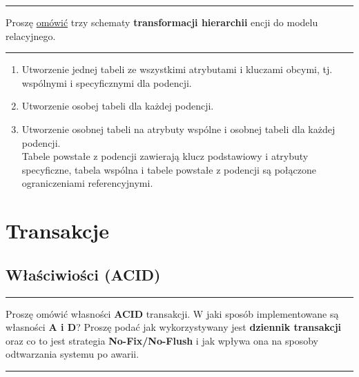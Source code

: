 \documentclass[a5paper,6pt]{article}
\newcommand{\horrule}[1]{\rule{\linewidth}{#1}}
\begin{document}
    \horrule{0.5pt}
    Proszę \underline{omówić} trzy schematy \textbf{transformacji hierarchii}
    encji do modelu relacyjnego.\\
    \horrule{0.5pt}

    \begin{enumerate}
        \item Utworzenie jednej tabeli ze wszystkimi atrybutami i kluczami
              obcymi, tj. wspólnymi i specyficznymi dla podencji.
        \item Utworzenie osobej tabeli dla każdej podencji.
        \item Utworzenie osobnej tabeli na atrybuty wspólne i osobnej tabeli
              dla każdej podencji.\\
              Tabele powstałe z podencji zawierają klucz podstawiowy i atrybuty
              specyficzne, tabela wspólna i tabele powstałe z podencji są
              połączone ograniczeniami referencyjnymi.
    \end{enumerate}


    \section{Transakcje} %
    \label{sec:transakcje}

    \subsection{Właściwiości (ACID)} %
    \label{sub:wlasciwiosci}

    \horrule{0.5pt}
     Proszę omówić własności \textbf{ACID} transakcji. W jaki sposób
          implementowane są własności \textbf{A i D}? Proszę podać jak
          wykorzystywany jest \textbf{dziennik transakcji} oraz co to jest
          strategia \textbf{No-Fix/No-Flush} i jak wpływa ona na sposoby
          odtwarzania systemu po awarii.\\
    \horrule{0.5pt}
\end{document}
